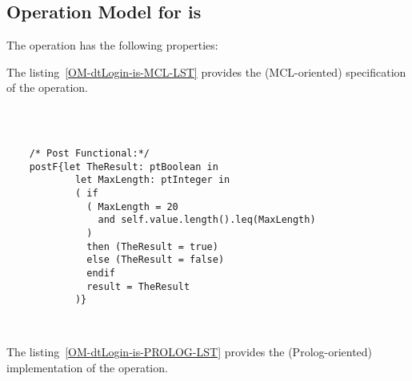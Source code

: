 \subsection{Operation Model for is}

\label{OM-is}


The  operation has the following properties:

	\begin{operationmodel}



		


	\end{operationmodel}



	\vspace{1cm}
	The listing~\ref{OM-dtLogin-is-MCL-LST} provides the \msrmessir (MCL-oriented) specification of the operation.
	
	\scriptsize
	\vspace{0.5cm}
	\begin{lstlisting}[style=MessirStyle,firstnumber=auto,captionpos=b,caption={\msrmessir (MCL-oriented) specification of the operation \emph{is}.},label=OM-dtLogin-is-MCL-LST]

	
	
	/* Post Functional:*/ 
	postF{let TheResult: ptBoolean in
	        let MaxLength: ptInteger in
	        ( if
	          ( MaxLength = 20
	            and self.value.length().leq(MaxLength)
	          )
	          then (TheResult = true)
	          else (TheResult = false)
	          endif
	          result = TheResult
	        )}
	
	
	\end{lstlisting}
	\normalsize 
	
	
	
	
	
	\vspace{1cm}
	The listing~\ref{OM-dtLogin-is-PROLOG-LST} provides the \msrmessir (Prolog-oriented) implementation of the operation.
	
	\scriptsize
	\vspace{0.5cm}
	
	
	\normalsize





